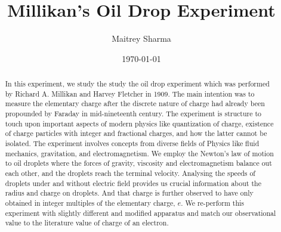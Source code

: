 \documentclass[%
 reprint,
 amsmath,amssymb,
 aps,
]{revtex4-2}
\begin{document}

\title{Millikan's Oil Drop Experiment}%


\author{Maitrey Sharma}




\date{\today}%

\begin{abstract}
In this experiment, we study the study the oil drop experiment which was performed by Richard A. Millikan and Harvey Fletcher in 1909. The main intention was to measure the elementary charge after the discrete nature of charge had already been propounded by Faraday in mid-nineteenth century. The experiment is structure to touch upon important aspects of modern physics like quantization of charge, existence of charge particles with integer and fractional charges, and how the latter cannot be isolated. The experiment involves concepts from diverse fields of Physics like fluid mechanics, gravitation, and electromagnetism. We employ the Newton's law of motion to oil droplets where the forces of gravity, viscosity and electromagnetism balance out each other, and the droplets reach the terminal velocity. Analysing the speeds of droplets under and without electric field provides us crucial information about the radius and charge on droplets. And that charge is further observed to have only obtained in integer multiples of the elementary charge, $e$. We re-perform this experiment with slightly different and modified apparatus and match our observational value to the literature value of charge of an electron.
\end{abstract}

\maketitle

\end{document}
